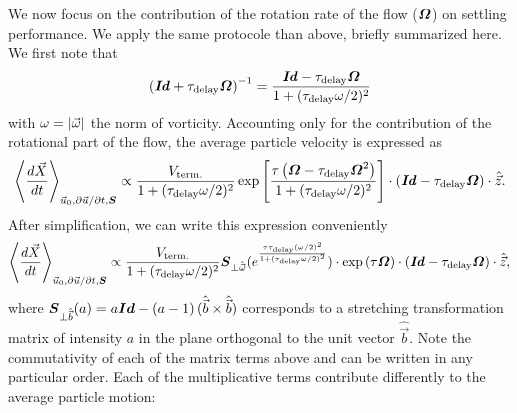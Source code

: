 We now focus on the contribution of the rotation rate of the flow ($\boldsymbol{\varOmega}$) on settling performance.
We apply the same protocole than above, briefly summarized here.
We first note that
\begin{equation}
	\left( \boldsymbol{\mathit{Id}} + \tau_{\mathrm{delay}} \boldsymbol{\varOmega} \right)^{-1} = \frac{\boldsymbol{\mathit{Id}} - \tau_{\mathrm{delay}} \boldsymbol{\varOmega}}{1 + (\tau_{\mathrm{delay}} \omega/2)^2}
\end{equation}
with $\omega = \lvert\vec{\omega}\rvert$ the norm of vorticity.
Accounting only for the contribution of the rotational part of the flow, the average particle velocity is expressed as
\begin{equation}
	\left\langle \frac{d \vec{X}}{dt} \right\rangle_{\vec{u}_0, \partial \vec{u} / \partial t, \boldsymbol{S}} \propto \frac{V_{\mathrm{term.}}}{1 + (\tau_{\mathrm{delay}} \omega/2)^2} \exp \left[ \frac{\tau \left( \boldsymbol{\varOmega} - \tau_{\mathrm{delay}} \boldsymbol{\varOmega}^2 \right)}{1 + (\tau_{\mathrm{delay}} \omega/2)^2} \right] \cdot \left( \boldsymbol{\mathit{Id}} - \tau_{\mathrm{delay}} \boldsymbol{\varOmega} \right) \cdot \hat{\vec{z}}.
\end{equation}
After simplification, we can write this expression conveniently
\begin{equation}
	\left\langle \frac{d \vec{X}}{dt} \right\rangle_{\vec{u}_0, \partial \vec{u} / \partial t, \boldsymbol{S}} \propto \frac{V_{\mathrm{term.}}}{1 + (\tau_{\mathrm{delay}} \omega/2)^2} \boldsymbol{S}_{\perp \hat{\vec{\omega}}} ( e^{\frac{\tau \tau_{\mathrm{delay}} (\omega/2)^2}{1 + (\tau_{\mathrm{delay}} \omega/2)^2}} ) \cdot \exp \left( \tau \boldsymbol{\varOmega} \right) \cdot \left( \boldsymbol{\mathit{Id}} - \tau_{\mathrm{delay}} \boldsymbol{\varOmega} \right) \cdot \hat{\vec{z}},
\end{equation}
where $\boldsymbol{S}_{\perp \hat{\vec{b}}}(a) = a \boldsymbol{Id} - (a - 1) \, (\hat{\vec{b}} \times \hat{\vec{b}})$ corresponds to a stretching transformation matrix of intensity $a$ in the plane orthogonal to the unit vector $\hat{\vec{b}}$.
Note the commutativity of each of the matrix terms above and can be written in any particular order.
Each of the multiplicative terms contribute differently to the average particle motion:
